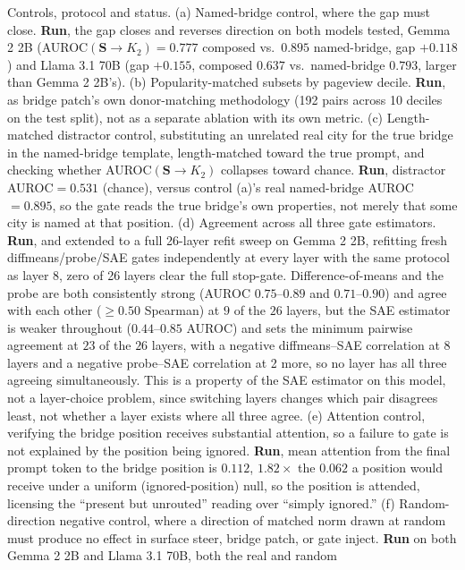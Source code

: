 \documentclass{article}
\newcommand{\gate}{\mathbf{S}}
\begin{document}
Controls, protocol and status. (a) Named-bridge control, where the gap must close. \textbf{Run}, the
gap closes and reverses direction on both models tested, Gemma 2 2B (AUROC$(\gate\!\to\!K_2)=0.777$
composed vs.\ $0.895$ named-bridge, gap $+0.118$) and Llama 3.1 70B (gap $+0.155$, composed $0.637$
vs.\ named-bridge $0.793$, larger than Gemma 2 2B's). (b) Popularity-matched subsets by
pageview decile. \textbf{Run}, as bridge patch's own donor-matching methodology (192 pairs across 10 deciles on
the test split), not as a separate ablation with its own metric. (c) Length-matched distractor
control, substituting an unrelated real city for the true bridge in the named-bridge template,
length-matched toward the true prompt, and checking whether AUROC$(\gate\!\to\!K_2)$ collapses toward
chance. \textbf{Run}, distractor AUROC$=0.531$ (chance), versus control (a)'s real named-bridge
AUROC$=0.895$, so the gate reads the true bridge's own properties, not merely that some city is
named at that position. (d) Agreement across all three gate estimators. \textbf{Run}, and extended to a full 26-layer refit
sweep on Gemma 2 2B, refitting fresh diffmeans/probe/SAE gates independently at every layer with the
same protocol as layer 8, zero of 26 layers clear the full stop-gate. Difference-of-means and the
probe are both consistently strong (AUROC $0.75$--$0.89$ and $0.71$--$0.90$) and agree with each other
($\ge0.50$ Spearman) at $9$ of the $26$ layers, but the SAE estimator is weaker throughout
($0.44$--$0.85$ AUROC) and sets the minimum pairwise agreement at $23$ of the $26$ layers, with a
negative diffmeans--SAE correlation at 8 layers and a negative probe--SAE correlation at 2 more, so no
layer has all three agreeing simultaneously. This is a property of the SAE estimator on this model,
not a layer-choice problem, since switching layers changes which pair disagrees least, not whether a
layer exists where all three agree. (e)
Attention control, verifying the bridge position receives substantial attention, so a
failure to gate is not explained by the position being ignored. \textbf{Run}, mean attention from the
final prompt token to the bridge position is $0.112$, $1.82\times$ the $0.062$ a position would
receive under a uniform (ignored-position) null, so the position is attended, licensing the
``present but unrouted'' reading over ``simply ignored.'' (f) Random-direction negative
control, where a direction of matched norm drawn at random must produce no effect in surface steer, bridge
patch, or gate inject. \textbf{Run} on both Gemma 2 2B and Llama 3.1 70B, both the real and random
\end{document}
